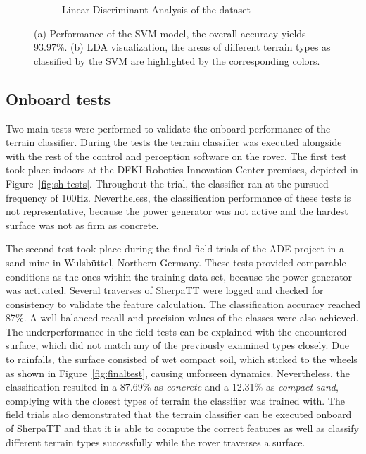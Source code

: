 \documentclass{article}
\begin{document}
\begin{figure}[!htb]
\begin{subfigure}[b]{0.44\textwidth}
        \caption{Linear Discriminant Analysis of the dataset}
    \end{subfigure}
    \caption{(a) Performance of the SVM model, the overall accuracy yields 93.97\%. (b) LDA visualization, the areas of different terrain types as classified by the SVM are highlighted by the corresponding colors.}
    \label{fig:offline-class}
\end{figure}
    

\subsection{Onboard tests}

Two main tests were performed to validate the onboard performance of the terrain classifier. During the tests the terrain classifier was executed alongside with the rest of the control and perception software on the rover. The first test took place indoors at the DFKI Robotics Innovation Center premises, depicted in Figure~\ref{fig:sh-tests}. Throughout the trial, the classifier ran at the pursued frequency of 100Hz. Nevertheless, the classification performance of these tests is not representative, because the power generator was not active and the hardest surface was not as firm as concrete. 

The second test took place during the final field trials of the ADE project \cite{ocon2021} in a sand mine in Wulsbüttel, Northern Germany.
These tests provided comparable conditions as the ones within the training data set, because the power generator was activated. Several traverses of SherpaTT were logged and checked for consistency to validate the feature calculation. The classification accuracy reached 87\%. A well balanced recall and precision values of the classes were also achieved. 
The underperformance in the field tests can be explained with the encountered surface, which did not match any of the previously examined types closely. Due to rainfalls, the surface consisted of wet compact soil, which sticked to the wheels as shown in Figure~\ref{fig:finaltest}, causing unforseen dynamics.
Nevertheless, the classification resulted in a 87.69\% as \emph{concrete} and a 12.31\% as \emph{compact sand}, complying with the closest types of terrain the classifier was trained with.
The field trials also demonstrated that the terrain classifier can be executed onboard of SherpaTT and that it is able to compute the correct features as well as classify different terrain types successfully while the rover traverses a surface.
\end{document}
